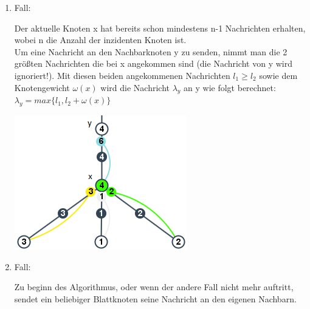 \begin{enumerate}
		
	
	\item Fall:
	
		\begin{minipage}{0.55\textwidth} 
			Der aktuelle Knoten x hat bereits schon mindestens n-1 Nachrichten erhalten, wobei n die Anzahl der inzidenten Knoten ist.\\
			
			Um eine Nachricht an den Nachbarknoten y zu senden, nimmt man die 2 größten Nachrichten die bei x angekommen sind (die Nachricht von y wird ignoriert!). Mit diesen beiden angekommenen Nachrichten $l_{1} \ge l_{2}$ sowie dem Knotengewicht $\omega(x)$ wird die Nachricht $\lambda_{y}$ an y wie folgt berechnet:\\
			$\lambda_{y} = max\{l_{1},  l_{2} + \omega(x)\}$
		\end{minipage}
		\hfill
		\begin{minipage}{0.35\textwidth}
			
			\includegraphics[width=\textwidth]{bilder/abb_paper_n-1knoten.png}
		\end{minipage}

		
		
	\item Fall:
		
		\begin{minipage}{0.55\textwidth} 
			Zu beginn des Algorithmus, oder wenn der andere Fall nicht mehr auftritt, sendet ein beliebiger Blattknoten seine Nachricht an den eigenen Nachbarn.\\
			

\end{minipage}
\end{enumerate}
